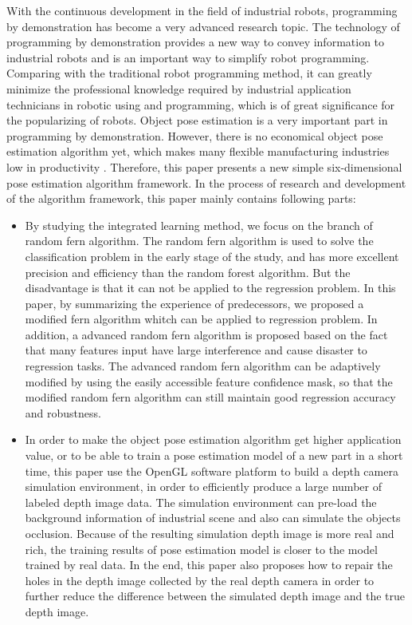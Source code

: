 \begin{englishabstract}
With the continuous development in the field of industrial robots, programming by demonstration has become a very advanced research topic. The technology of programming by demonstration provides a new way to convey information to industrial robots and is an important way to simplify robot programming. Comparing with the traditional robot programming method, it can greatly minimize the professional knowledge required by industrial application technicians in robotic using and programming, which is of great significance for the popularizing of robots. Object pose estimation is a very important part in programming by demonstration. However, there is no economical object pose estimation algorithm yet, which makes many flexible manufacturing industries low in productivity
. Therefore, this paper presents a new simple six-dimensional pose estimation algorithm framework. In the process of research and development of the algorithm framework, this paper mainly contains following parts:


\begin{itemize}
\item By studying the integrated learning method, we focus on the branch of random fern algorithm. The random fern algorithm is used to solve the classification problem in the early stage of the study, and has more excellent precision and efficiency than the random forest algorithm. But the disadvantage is that it can not be applied to the regression problem. In this paper, by summarizing the experience of predecessors, we proposed a modified fern algorithm whitch can be applied to regression problem. In addition, a advanced random fern algorithm is proposed based on the fact that many features input have large interference and cause disaster to regression tasks. The advanced random fern algorithm can be adaptively modified by using the easily accessible feature confidence mask, so that the modified random fern algorithm can still maintain good regression accuracy and robustness.

\item In order to make the object pose estimation algorithm get higher application value, or to be able to train a pose estimation model of a new part in a short time, this paper use the OpenGL software platform to build a depth camera simulation environment, in order to efficiently produce a large number of labeled depth image data. The simulation environment can pre-load the background information of industrial scene and also can simulate the objects occlusion. Because of the resulting simulation depth image is more real and rich, the training results of pose estimation model is closer to the model trained by real data. In the end, this paper also proposes how to repair the holes in the depth image collected by the real depth camera in order to further reduce the difference between the simulated depth image and the true depth image.


\end{itemize}
\end{englishabstract}
